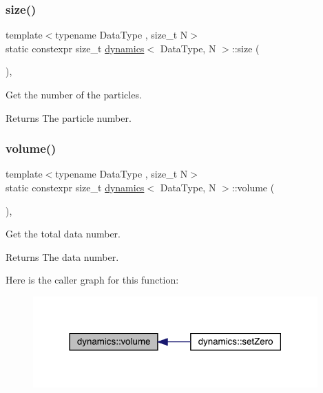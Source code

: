 \subsubsection{\texorpdfstring{size()}{size()}}
{\footnotesize\ttfamily template$<$typename Data\+Type , size\+\_\+t N$>$ \\
static constexpr size\+\_\+t \mbox{\hyperlink{classdynamics}{dynamics}}$<$ Data\+Type, N $>$\+::size (\begin{DoxyParamCaption}{ }\end{DoxyParamCaption})\hspace{0.3cm}{\ttfamily [inline]}, {\ttfamily [static]}}



Get the number of the particles. 

\begin{DoxyReturn}{Returns}
The particle number. 
\end{DoxyReturn}
\mbox{\label{classdynamics_ada4a2418d86de3072e1a238a95e6bdb2}} 
\subsubsection{\texorpdfstring{volume()}{volume()}}
{\footnotesize\ttfamily template$<$typename Data\+Type , size\+\_\+t N$>$ \\
static constexpr size\+\_\+t \mbox{\hyperlink{classdynamics}{dynamics}}$<$ Data\+Type, N $>$\+::volume (\begin{DoxyParamCaption}{ }\end{DoxyParamCaption})\hspace{0.3cm}{\ttfamily [inline]}, {\ttfamily [static]}}



Get the total data number. 

\begin{DoxyReturn}{Returns}
The data number. 
\end{DoxyReturn}
Here is the caller graph for this function\+:\nopagebreak
\begin{figure}[H]
\begin{center}
\leavevmode
\includegraphics[width=310pt]{classdynamics_ada4a2418d86de3072e1a238a95e6bdb2_icgraph}
\end{center}
\end{figure}


